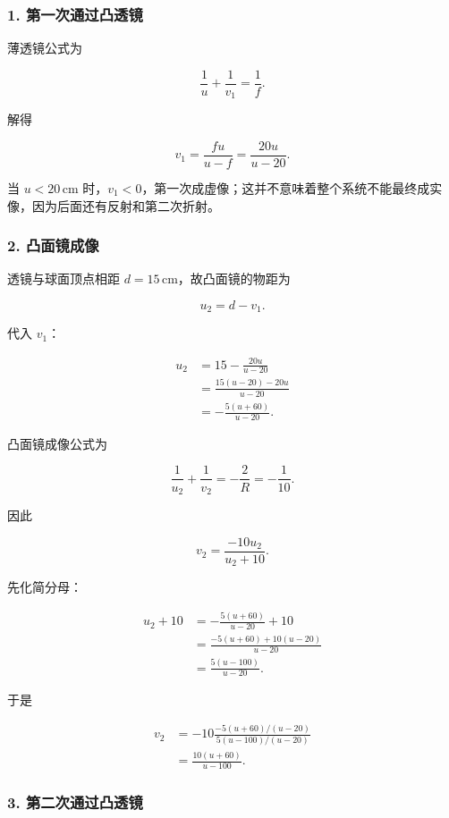 \documentclass[12pt,a4paper,UTF8]{ctexart}
\begin{document}
\subsubsection{1.
第一次通过凸透镜}\label{ux7b2cux4e00ux6b21ux901aux8fc7ux51f8ux900fux955c}

薄透镜公式为

\[
\frac{1}{u}+\frac{1}{v_1}=\frac{1}{f}.
\]

解得

\[
v_1=\frac{fu}{u-f}=\frac{20u}{u-20}.
\]

当 \(u<20\,\mathrm{cm}\)
时，\(v_1<0\)，第一次成虚像；这并不意味着整个系统不能最终成实像，因为后面还有反射和第二次折射。

\subsubsection{2. 凸面镜成像}\label{ux51f8ux9762ux955cux6210ux50cf}

透镜与球面顶点相距 \(d=15\,\mathrm{cm}\)，故凸面镜的物距为

\[
u_2=d-v_1.
\]

代入 \(v_1\)：

\[
\begin{aligned}
u_2
&=15-\frac{20u}{u-20}\\
&=\frac{15(u-20)-20u}{u-20}\\
&=-\frac{5(u+60)}{u-20}.
\end{aligned}
\]

凸面镜成像公式为

\[
\frac{1}{u_2}+\frac{1}{v_2}=-\frac{2}{R}=-\frac{1}{10}.
\]

因此

\[
v_2=\frac{-10u_2}{u_2+10}.
\]

先化简分母：

\[
\begin{aligned}
u_2+10
&=-\frac{5(u+60)}{u-20}+10\\
&=\frac{-5(u+60)+10(u-20)}{u-20}\\
&=\frac{5(u-100)}{u-20}.
\end{aligned}
\]

于是

\[
\begin{aligned}
v_2
&=-10\frac{-5(u+60)/(u-20)}{5(u-100)/(u-20)}\\
&=\frac{10(u+60)}{u-100}.
\end{aligned}
\]

\subsubsection{3.
第二次通过凸透镜}\label{ux7b2cux4e8cux6b21ux901aux8fc7ux51f8ux900fux955c}
\end{document}
